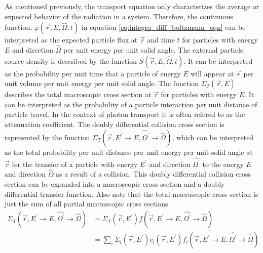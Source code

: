 As mentioned previously, the transport equation only characterizes the average
or expected behavior of the radiation in a system. Therefore, the
continuous function, $\varphi(\vec{r},E,\hat{\Omega},t)$ in equation 
\ref{eq:integro_diff_boltzmann_eqn} can be interpreted as the expected particle 
flux at $\vec{r}$ and time $t$ for particles with energy $E$ and direction
$\hat{\Omega}$ per unit energy per unit solid angle. The external particle 
source density is described by the function $S(\vec{r},E,\hat{\Omega},t)$. It 
can be interpreted as the probability per unit time that a particle of energy 
$E$ will appear at $\vec{r}$ per unit volume per unit energy per unit solid 
angle. The function $\Sigma_T(\vec{r},E)$ describes the total macroscopic cross 
section at $\vec{r}$ for particles with energy $E$. It can be interpreted as the
probability of a particle interaction per unit distance of particle travel. In 
the context of photon transport it is often refered to as the attenuation 
coefficient. The doubly differential collision cross section is represented by 
the function $\Sigma_T(\vec{r},E^{'} \to E,\hat{\Omega^{'}} \to \hat{\Omega})$, 
which can be interpreted as the total probability per unit distance per unit 
energy per unit solid angle at $\vec{r}$ for the transfer of a particle with 
energy $E^{'}$ and direction $\hat{\Omega^{'}}$ to the energy $E$ and direction 
$\hat{\Omega}$ as a result of a collision. This doubly differential collision 
cross section can be expanded into a macroscopic cross section and a doubly 
differential transfer function. Also note that the total macroscopic cross 
section is just the sum of all partial macroscopic cross sections.
\begin{align}
  \Sigma_T(\vec{r},E^{'} \to E,\hat{\Omega^{'}} \to \hat{\Omega}) & =
  \Sigma_T(\vec{r},E^{'})
  f(\vec{r},E^{'} \to E,\hat{\Omega^{'}} \to \hat{\Omega}) \\
  & = \sum_i \Sigma_i(\vec{r},E^{'}) c_i(\vec{r},E^{'})
  f_i(\vec{r},E^{'} \to E,\hat{\Omega^{'}} \to \hat{\Omega})
  \label{eq:expanded_diff_collision_cross_sec}
\end{align}

